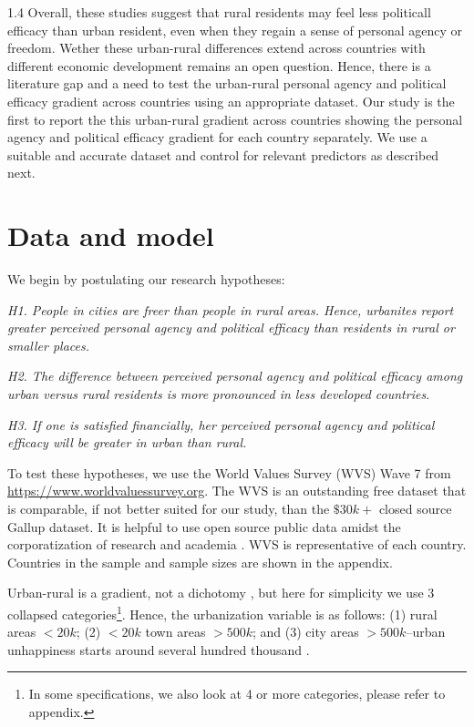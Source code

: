 \documentclass[10pt, letterpaper]{article}
\begin{document}
\begin{spacing}{1.4}
Overall, these studies suggest that rural residents may feel less politicall efficacy than urban resident, even when they regain a sense of personal agency or freedom. Wether these urban-rural differences extend across countries with different economic development remains an open question. Hence, there is a literature gap and a need to test the urban-rural personal agency and political efficacy gradient across countries using an appropriate dataset. Our study is the first to report the this urban-rural gradient across countries showing the personal agency and political efficacy gradient for each country separately. We use a suitable and accurate dataset and control for relevant predictors as described next.


\section{Data and model}

We begin by postulating our research hypotheses: 

\textit{ H1. People in cities are freer than people in rural areas. Hence, urbanites report greater perceived personal agency and political efficacy than residents in rural or smaller places.}

\textit{ H2. The difference between perceived personal agency and political efficacy among urban versus rural residents is more pronounced in less developed countries}.

\textit{ H3. If one is satisfied financially, her perceived personal agency and
  political efficacy will be greater in urban than rural. %
}

To test these hypotheses, we use the World Values Survey (WVS) Wave 7 from  
 \url{https://www.worldvaluessurvey.org}. The WVS is an outstanding free dataset that is comparable, if not better suited for our study, than the $\$30k+$ closed source Gallup dataset. It is helpful to use open source public data amidst the corporatization of research and academia \citep{mills2012corporatization,cox2013corporatization,millsNYT12fa,CatropaNYT20feb8,schmidlinNYT15oct10}. 
WVS is representative of each country. Countries in the sample and sample sizes are shown in the appendix.

Urban-rural is a gradient, not a dichotomy \citep{aok-ls_fisher16}, but here for
simplicity we use 3 collapsed categories\footnote{In some specifications, we
  also look at 4 or more categories, please refer to appendix.}.   
Hence, the urbanization variable is as follows: (1) rural areas  $<20k$;  (2)  $<20k$ town areas $>500k$; and (3) city areas   $>500k$--urban unhappiness starts around several hundred thousand \citep{aok-ls_fisher16}.


\end{spacing}
\end{document}
